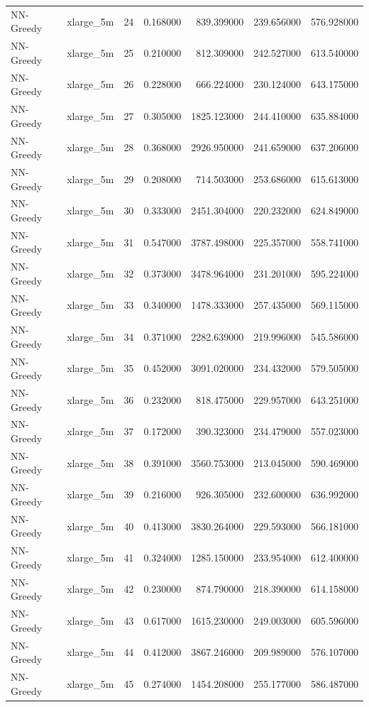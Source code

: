 \begin{tabular}{llrrrrr}
NN-Greedy & xlarge_5m & 24 & 0.168000 & 839.399000 & 239.656000 & 576.928000 \\
NN-Greedy & xlarge_5m & 25 & 0.210000 & 812.309000 & 242.527000 & 613.540000 \\
NN-Greedy & xlarge_5m & 26 & 0.228000 & 666.224000 & 230.124000 & 643.175000 \\
NN-Greedy & xlarge_5m & 27 & 0.305000 & 1825.123000 & 244.410000 & 635.884000 \\
NN-Greedy & xlarge_5m & 28 & 0.368000 & 2926.950000 & 241.659000 & 637.206000 \\
NN-Greedy & xlarge_5m & 29 & 0.208000 & 714.503000 & 253.686000 & 615.613000 \\
NN-Greedy & xlarge_5m & 30 & 0.333000 & 2451.304000 & 220.232000 & 624.849000 \\
NN-Greedy & xlarge_5m & 31 & 0.547000 & 3787.498000 & 225.357000 & 558.741000 \\
NN-Greedy & xlarge_5m & 32 & 0.373000 & 3478.964000 & 231.201000 & 595.224000 \\
NN-Greedy & xlarge_5m & 33 & 0.340000 & 1478.333000 & 257.435000 & 569.115000 \\
NN-Greedy & xlarge_5m & 34 & 0.371000 & 2282.639000 & 219.996000 & 545.586000 \\
NN-Greedy & xlarge_5m & 35 & 0.452000 & 3091.020000 & 234.432000 & 579.505000 \\
NN-Greedy & xlarge_5m & 36 & 0.232000 & 818.475000 & 229.957000 & 643.251000 \\
NN-Greedy & xlarge_5m & 37 & 0.172000 & 390.323000 & 234.479000 & 557.023000 \\
NN-Greedy & xlarge_5m & 38 & 0.391000 & 3560.753000 & 213.045000 & 590.469000 \\
NN-Greedy & xlarge_5m & 39 & 0.216000 & 926.305000 & 232.600000 & 636.992000 \\
NN-Greedy & xlarge_5m & 40 & 0.413000 & 3830.264000 & 229.593000 & 566.181000 \\
NN-Greedy & xlarge_5m & 41 & 0.324000 & 1285.150000 & 233.954000 & 612.400000 \\
NN-Greedy & xlarge_5m & 42 & 0.230000 & 874.790000 & 218.390000 & 614.158000 \\
NN-Greedy & xlarge_5m & 43 & 0.617000 & 1615.230000 & 249.003000 & 605.596000 \\
NN-Greedy & xlarge_5m & 44 & 0.412000 & 3867.246000 & 209.989000 & 576.107000 \\
NN-Greedy & xlarge_5m & 45 & 0.274000 & 1454.208000 & 255.177000 & 586.487000 \\

\end{tabular}
